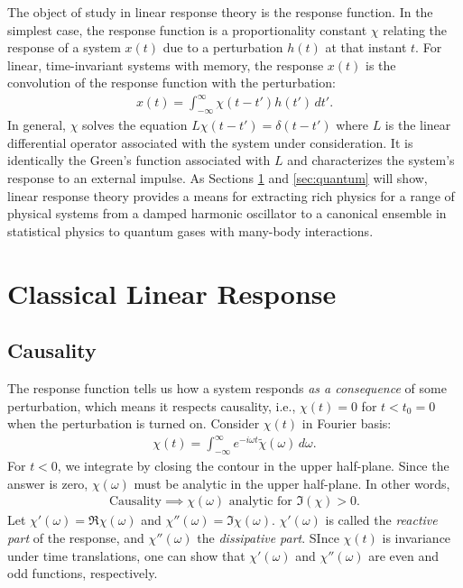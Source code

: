 \documentclass[reprint,
nofootinbib,
amsmath,amssymb,
aps]{revtex4-1}
\begin{document}
The object of study in linear response theory is the response function. In the simplest case, the response function is a proportionality constant $\chi$ relating the response of a system $x(t)$ due to a perturbation $h(t)$ at that instant $t$. For linear, time-invariant systems with memory, the response $x(t)$ is the convolution of the response function with the perturbation:
\begin{align}\label{eq:linear_response}
x(t) = \int_{-\infty}^{\infty} \chi(t-t') h(t') \,dt'.
\end{align}
In general, $\chi$ solves the equation $ L \chi(t-t') = \delta(t-t')$ where $L$ is the linear differential operator associated with the system under consideration. It is identically the Green's function associated with $L$ and characterizes the system's response to an external impulse. As Sections \ref{sec:classical} and \ref{sec:quantum} will show, linear response theory provides a means for extracting rich physics for a range of physical systems from a damped harmonic oscillator to a canonical ensemble in statistical physics to quantum gases with many-body interactions. 


\section{Classical Linear Response}\label{sec:classical}

%
\subsection{Causality}
The response function tells us how a system responds \textit{as a consequence} of some perturbation, which means it respects causality, i.e., $\chi(t) = 0$ for $t < t_0 = 0$ when the perturbation is turned on. Consider $\chi(t)$ in Fourier basis:
\begin{align*}
\chi(t) = \int_{-\infty}^\infty  e^{-i\omega t } \tilde{\chi}(\omega) \,d\omega.
\end{align*}
For $t<0$, we integrate by closing the contour in the upper half-plane. Since the answer is zero, $\chi(\omega)$ must be analytic in the upper half-plane. In other words, 
\begin{align*}
\text{Causality} \implies \chi(\omega) \text{ analytic for } \Im(\chi) > 0.
\end{align*}
Let $\chi'(\omega) = \Re \chi(\omega)$ and $\chi''(\omega) = \Im \chi(\omega)$. $\chi'(\omega)$ is called the \textit{reactive part} of the response, and $\chi''(\omega)$ the \textit{dissipative part}. SInce $\chi(t)$ is invariance under time translations, one can show that $\chi'(\omega)$ and $\chi''(\omega)$ are even and odd functions, respectively.
\end{document}
